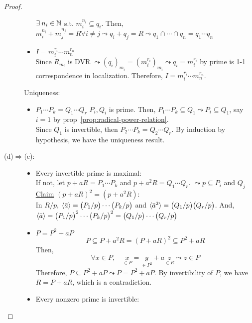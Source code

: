 \begin{theorem}
\begin{proof}
\begin{description}
\begin{itemize}
            $\exists n_i \in \Nb$ s.t. $m_i^{n_i} \subseteq q_i$. Then,
            $m_i^{n_i} + m_j^{n_j} = R \forall i \neq
            j \leadsto q_i + q_j  = R \leadsto q_1 \cap \cdots \cap q_n = q_1 \cdots
             q_n$
           \item $I = m_i^{r_i} \cdots m_n^{r_n}$ \\
             Since $R_{m_i}$ is DVR $\leadsto (q_i)_{m_i} = (m_i^{r_i})_{m_i} \leadsto
              q_i = m_i^{r_i}$ by prime is 1-1 correspondence in localization. 
              Therefore,  $I = m_i^{r_i} \cdots m_n^{r_n}$. 
        \end{itemize}
        Uniqueness: 
        \begin{itemize}
          \item $P_1\cdots P_k = Q_1\cdots Q_r$ $P_i, Q_i$ is prime. Then, $P_1\cdots
             P_k \subseteq Q_1 \leadsto P_i \subseteq Q_1$, say $i = 1$ by 
             prop~\ref{prop:radical-power-relation}. \\
             Since $Q_1$ is invertible, then $P_2\cdots P_k = Q_2\cdots Q_r$. By 
             induction by hypothesis, we have the uniqueness result.
        \end{itemize}
      \item[\rm (d)$\Rightarrow$(c):] \mbox{}
        \begin{itemize}
          \item Every invertible prime is maximal: \\
            If not, let $p + aR = P_1 \cdots P_k$ and $p + a^2R = Q_1 \cdots Q_r$. 
            $\leadsto p \subseteq P_i$ and $Q_j$\\
            \underline{Claim} $(p + aR)^2 = (p + a^2R)$: \\
            In $R/p$, $\langle\bar{a}\rangle = \big(P_1/p\big) \cdots \big(P_k/p\big)$ and 
            $\langle\bar{a}^2\rangle= \big(Q_1/p\big)\big(Q_r/p\big)$. And, $\langle\bar{a}\rangle
             = \big(P_1/p\big)^2 \cdots \big(P_k/p\big)^2 = \big(Q_1/p\big) \cdots
             \big(Q_r/p\big)$
          \item $P = P^2 + aP$
             $$
             P \subseteq P + a^2R = (P + aR)^2 \subseteq P^2 + aR
             $$
             Then,
             $$
             \forall x \in P, \quad \underset{\in P}{x} = \underset{\in P^2}{y}
             + a\underset{\in R}{z} \leadsto z \in P
             $$
             Therefore, $P\subseteq P^2 + aP \leadsto P = P^2 + aP$. 
        By invertibility of $P$, we have $R = P + aR$, which is a contradiction.
        \item Every nonzero prime is invertible: \\

\end{itemize}
\end{description}
\end{proof}
\end{theorem}
